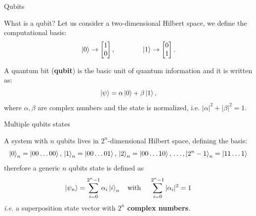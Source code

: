 \documentclass[aspectratio=169, 10pt, xcolor={svgnames}, hyperref={linkcolor=black}]{beamer}
\begin{document}
\begin{frame}{Qubits}
\begin{figure}
        \end{figure}
\end{frame}

\begin{frame}[fragile]{What is a qubit?}
   \pause
   Let us consider a two-dimensional {\color{blue}Hilbert space}, we define the computational basis:
   \begin{equation*}
   \ket{0} \rightarrow  \begin{bmatrix} 1 \\ 0 \end{bmatrix}, \qquad \qquad
   \ket{1} \rightarrow  \begin{bmatrix} 0 \\ 1 \end{bmatrix}.
   \end{equation*}

   A {\color{red}quantum bit} (\textbf{qubit}) is the basic unit of quantum information and it is written as:
   \begin{equation*}
   \ket{\psi}=\alpha\ket{0} +\beta\ket{1},
   \end{equation*}
   where $\alpha, \beta$ are {\color{violet}complex numbers} and the {\color{blue}state is normalized}, i.e. $|\alpha|^2+|\beta|^2=1$.


 \end{frame}

 \begin{frame}[fragile]{Multiple qubits states}

 A system with $n$ qubits lives in {\color{red}$2^n$-dimensional Hilbert space}, defining the basis:
 \begin{equation*}
 \ket{0}_n = \ket{00\dots0 0},\, \ket{1}_n = \ket{00\dots01},\, \ket{2}_n = \ket{00\dots10}, \, \dots, \ket{2^n -1}_n = \ket{11\dots1}
 \end{equation*}
 therefore a generic $n$ qubits state is defined as
 \begin{equation*}
 \ket{\psi_n}= \sum_{i=0}^{2^n-1} \alpha_i \ket{i}_n \quad \text{with } \quad  \sum_{i=0}^{2^n-1} |\alpha_i |^2 = 1
 \end{equation*}
 \textit{i.e.} a {\color{blue}superposition state vector} with \textbf{$2^n$ complex numbers}.

 \end{frame}
\end{document}
